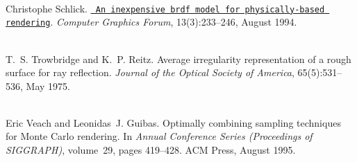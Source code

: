 \begin{DoxyDescription}
\item[\label{citelist_CITEREF_Schlick:1994:BRDF}%
\Hypertarget{citelist_CITEREF_Schlick:1994:BRDF}%
\mbox{[}13\mbox{]}]\hfill \\
Christophe Schlick. \href{https://onlinelibrary.wiley.com/doi/abs/10.1111/1467-8659.1330233}{\texttt{ An inexpensive brdf model for physically-\/based rendering}}. {\itshape Computer Graphics Forum}, 13(3)\+:233--246, August 1994. 


\item[\label{citelist_CITEREF_Trowbridge:1975:Average}%
\Hypertarget{citelist_CITEREF_Trowbridge:1975:Average}%
\mbox{[}14\mbox{]}]\hfill \\
T.~S. Trowbridge and K.~P. Reitz. Average irregularity representation of a rough surface for ray reflection. {\itshape Journal of the Optical Society of America}, 65(5)\+:531--536, May 1975. 


\item[\label{citelist_CITEREF_Veach:1995:Optimally}%
\Hypertarget{citelist_CITEREF_Veach:1995:Optimally}%
\mbox{[}15\mbox{]}]\hfill \\
Eric Veach and Leonidas~J. Guibas. Optimally combining sampling techniques for Monte Carlo rendering. In {\itshape Annual Conference Series (Proceedings of SIGGRAPH)}, volume~29, pages 419--428. ACM Press, August 1995. 


\end{DoxyDescription}